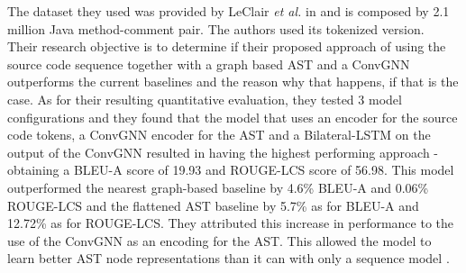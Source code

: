 The dataset they used was provided by LeClair \textit{et al.} in \cite{burstein2019proceedings} and 
is composed by 2.1 million Java method-comment pair. The authors used its tokenized version.\\
\newline
Their research objective is to determine if their proposed approach of using 
the source code sequence together with a graph based AST and a ConvGNN outperforms
the current baselines and the reason why that happens, if that is the case.
As for their resulting quantitative evaluation, they tested 3 model configurations and they found that the model 
that uses an encoder for the source code tokens, a ConvGNN encoder for the AST and a Bilateral-LSTM on the output 
of the ConvGNN resulted in having the highest performing approach - obtaining a BLEU-A score of 19.93 
and ROUGE-LCS score of 56.98. This model outperformed the nearest graph-based baseline 
by 4.6\% BLEU-A and 0.06\% ROUGE-LCS and the flattened AST baseline by 5.7\% as for BLEU-A and 12.72\%
as for ROUGE-LCS. They attributed this increase in performance to the use of the 
ConvGNN as an encoding for the AST. This allowed the model to learn better AST node representations than it can with 
only a sequence model \cite{Leclair2020}.


